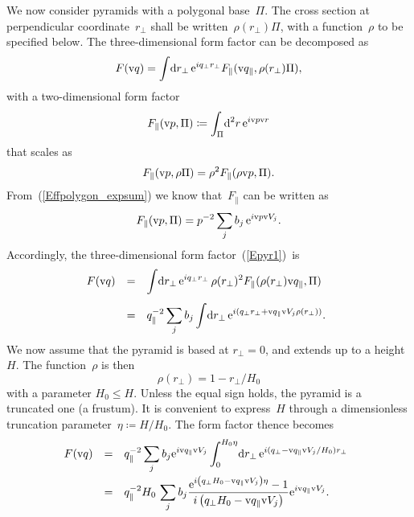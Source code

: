 We now consider pyramids with a polygonal base~$\Pi$.
The cross section at perpendicular coordinate~$r_\perp$
shall be written~$\rho(r_\perp)\Pi$,
with a function~$\rho$ to be specified below.
The three-dimensional form factor can be decomposed as
\begin{equation}\label{Epyr1}
  F(\text{v}{q})
  = \int\!\text{d} r_\perp\,\text{e}^{iq_\perp r_\perp} F_\parallel(\text{v}{q}_\parallel,\rho(r_\perp)\Pi),
\end{equation}
with a two-dimensional form factor
\begin{equation}
  F_\parallel(\text{v}{p},\Pi) \coloneqq \int_\Pi\!\text{d}^2r\,\text{e}^{i\text{v}{p}\text{v}{r}}
\end{equation}
that scales as
\begin{equation}
  F_\parallel(\text{v}{p},\rho\Pi) = \rho^2 F_\parallel(\rho\text{v}{p},\Pi).
\end{equation}
From~(\ref{Effpolygon_expsum}) we know that~$F_\parallel$ can be written as
\begin{equation}
  F_\parallel(\text{v}{p},\Pi)=p^{-2}\sum_j b_j\, \text{e}^{i\text{v}{p} \text{v}{V}_j}.
\end{equation}
Accordingly, the three-dimen\-sional form factor~(\ref{Epyr1})~is
\begin{equation}
  \begin{array}{@{}lcl}
  F(\q)
  &=& \displaystyle
       \int\!\d r_\perp\,\e^{iq_\perp r_\perp}\,\rho(r_\perp)^2 F_\parallel(\rho(r_\perp)\q_\parallel,\Pi)
\\[3ex]
  &=& \displaystyle
      q_\parallel^{-2}  \sum_j b_j
      \int\!\d r_\perp\,\e^{i(q_\perp r_\perp+\q_\parallel \V_j\rho(r_\perp))}.
  \end{array}
\end{equation}
We now assume that the pyramid is based at $r_\perp=0$,
and extends up to a height~$H$.
The function~$\rho$ is then
\begin{equation}
  \rho(r_\perp) = 1-r_\perp/H_0
\end{equation}
with a parameter $H_0\le H$.
Unless the equal sign holds,
the pyramid is a truncated one (a frustum).
It is convenient to express~$H$ through
a dimensionless truncation parameter~$\eta\coloneqq H/H_0$.
The form factor thence becomes 
\begin{equation}
  \begin{array}{@{}lcl}
  F(\q)
  &=& \displaystyle
      q_\parallel^{-2}  \sum_j b_j \e^{i\q_\parallel \V_j}
      \int_0^{H_0\eta}\!\d r_\perp\,\e^{i(q_\perp-\q_\parallel \V_j/H_0)r_\perp}
\\[3ex]
  &=& \displaystyle
       q_\parallel^{-2} H_0\, \sum_j b_j  
          \frac{\e^{i\left(q_\perp H_0-\q_\parallel\V_j\right)\eta}-1}
               {i\left(q_\perp H_0 - \q_\parallel\V_j\right)}
               \e^{i\q_\parallel \V_j}.
  \end{array}
\end{equation}
